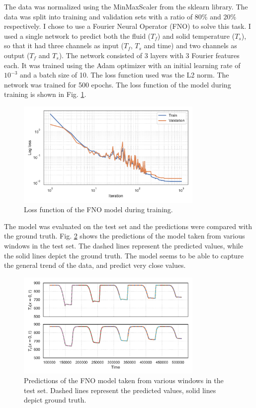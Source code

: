 \documentclass[unicode,11pt,a4paper,oneside,numbers=endperiod,openany]{scrartcl}
\begin{document}
The data was normalized using the MinMaxScaler from the sklearn library.
The data was split into training and validation sets with a
ratio of 80\% and 20\% respectively.
I chose to use a Fourier Neural Operator (FNO) to solve this task. I used a
single network to predict both the fluid ($T_f$) and solid temperature ($T_s$),
so that it had three
channels as input ($T_f$, $T_s$ and time) and two channels as output ($T_f$ and
$T_s$). 
The network
consisted of 3 layers with 3 Fourier features each.
It was trained using the Adam optimizer with an initial learning rate
of $10^{-3}$ and a batch size of 10. The loss function used was the L2 norm. The
network was trained for 500 epochs.
The loss function of the model during training is shown in Fig. \ref{fig:loss}.
\begin{figure}[ht!]
    \centering
    \includegraphics[width=0.8\textwidth]{../task1/fno/loss_function.pdf}
    \caption{Loss function of the FNO model during training.}
    \label{fig:loss}
\end{figure}

The model was evaluated on the test set and the predictions were compared with
the ground truth. Fig. \ref{fig:predictions} shows the predictions of the model
taken from various windows in the test set. The dashed lines represent the
predicted values, while the solid lines depict the ground truth.
The model seems to be able to capture the general trend of the data, and predict
very close values.
\begin{figure}[ht!]
    \centering
    \includegraphics[width=0.8\textwidth]{../task1/fno/plot_predictions.pdf}
    \caption{Predictions of the FNO model taken from various windows in the test set. Dashed lines represent the predicted values, solid lines depict ground truth.}
    \label{fig:predictions}
\end{figure}
\end{document}
